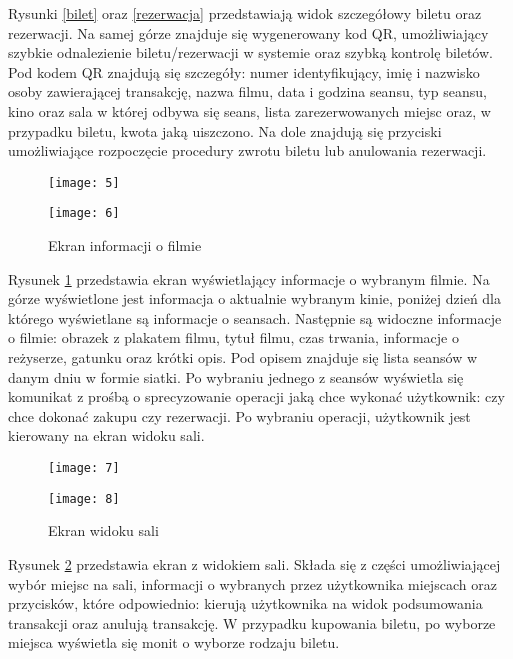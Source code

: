 Rysunki \ref{bilet} oraz \ref{rezerwacja} przedstawiają widok szczegółowy biletu oraz rezerwacji. Na samej górze znajduje się wygenerowany kod QR, umożliwiający szybkie odnalezienie biletu/rezerwacji w systemie oraz szybką kontrolę biletów. Pod kodem QR znajdują się szczegóły:  numer identyfikujący, imię i nazwisko osoby zawierającej transakcję, nazwa filmu, data i godzina seansu, typ seansu, kino oraz sala w której odbywa się seans, lista zarezerwowanych miejsc oraz, w przypadku biletu, kwota jaką uiszczono. Na dole znajdują się przyciski umożliwiające rozpoczęcie procedury zwrotu biletu lub anulowania rezerwacji.

\newpage
\begin{figure}[h]
\centering
\begin{minipage}{.5\textwidth}
  \centering
  \texttt{[image: 5]}
\end{minipage}%
\begin{minipage}{.5\textwidth}
  \centering
  \texttt{[image: 6]}
\end{minipage}
\caption{Ekran informacji o filmie}
\label{info}
\end{figure}

Rysunek \ref{info} przedstawia ekran wyświetlający informacje o wybranym filmie. Na górze wyświetlone jest informacja o aktualnie wybranym kinie, poniżej dzień dla którego wyświetlane są informacje o seansach. Następnie są widoczne informacje o filmie: obrazek z plakatem filmu, tytuł filmu, czas trwania, informacje o reżyserze, gatunku oraz krótki opis. Pod opisem znajduje się lista seansów w danym dniu w formie siatki. Po wybraniu jednego z seansów wyświetla się komunikat z prośbą o sprecyzowanie operacji jaką chce wykonać użytkownik: czy chce dokonać zakupu czy rezerwacji. Po wybraniu operacji, użytkownik jest kierowany na ekran widoku sali.
\newpage
\begin{figure}[h]
\centering
\begin{minipage}{.5\textwidth}
  \centering
  \texttt{[image: 7]}
\end{minipage}%
\begin{minipage}{.5\textwidth}
  \centering
  \texttt{[image: 8]}
\end{minipage}
\caption{Ekran widoku sali}
\label{sala}
\end{figure}

Rysunek \ref{sala} przedstawia ekran z widokiem sali. Składa się z części umożliwiającej wybór miejsc na sali, informacji o wybranych przez użytkownika miejscach oraz przycisków, które odpowiednio: kierują użytkownika na widok podsumowania transakcji oraz anulują transakcję. W przypadku kupowania biletu, po wyborze miejsca wyświetla się monit o wyborze rodzaju biletu.

